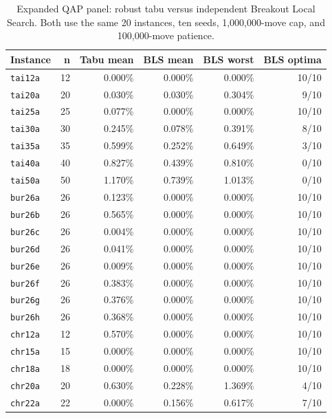\documentclass[pdflatex,sn-mathphys-num]{sn-jnl}
\begin{document}
\begin{table}[t]
\centering
\caption{Expanded QAP panel: robust tabu versus independent Breakout Local Search. Both use the
same 20 instances, ten seeds, 1,000,000-move cap, and 100,000-move patience.}
\label{tab:qap-bls}
\small
\begin{tabular}{lrrrrr}
\toprule
Instance & n & Tabu mean & BLS mean & BLS worst & BLS optima \\
\midrule
\texttt{tai12a} & 12 & 0.000\% & 0.000\% & 0.000\% & 10/10 \\
\texttt{tai20a} & 20 & 0.030\% & 0.030\% & 0.304\% & 9/10 \\
\texttt{tai25a} & 25 & 0.077\% & 0.000\% & 0.000\% & 10/10 \\
\texttt{tai30a} & 30 & 0.245\% & 0.078\% & 0.391\% & 8/10 \\
\texttt{tai35a} & 35 & 0.599\% & 0.252\% & 0.649\% & 3/10 \\
\texttt{tai40a} & 40 & 0.827\% & 0.439\% & 0.810\% & 0/10 \\
\texttt{tai50a} & 50 & 1.170\% & 0.739\% & 1.013\% & 0/10 \\
\texttt{bur26a} & 26 & 0.123\% & 0.000\% & 0.000\% & 10/10 \\
\texttt{bur26b} & 26 & 0.565\% & 0.000\% & 0.000\% & 10/10 \\
\texttt{bur26c} & 26 & 0.004\% & 0.000\% & 0.000\% & 10/10 \\
\texttt{bur26d} & 26 & 0.041\% & 0.000\% & 0.000\% & 10/10 \\
\texttt{bur26e} & 26 & 0.009\% & 0.000\% & 0.000\% & 10/10 \\
\texttt{bur26f} & 26 & 0.383\% & 0.000\% & 0.000\% & 10/10 \\
\texttt{bur26g} & 26 & 0.376\% & 0.000\% & 0.000\% & 10/10 \\
\texttt{bur26h} & 26 & 0.368\% & 0.000\% & 0.000\% & 10/10 \\
\texttt{chr12a} & 12 & 0.570\% & 0.000\% & 0.000\% & 10/10 \\
\texttt{chr15a} & 15 & 0.000\% & 0.000\% & 0.000\% & 10/10 \\
\texttt{chr18a} & 18 & 0.000\% & 0.000\% & 0.000\% & 10/10 \\
\texttt{chr20a} & 20 & 0.630\% & 0.228\% & 1.369\% & 4/10 \\
\texttt{chr22a} & 22 & 0.000\% & 0.156\% & 0.617\% & 7/10 \\
\bottomrule
\end{tabular}
\end{table}
\end{document}
